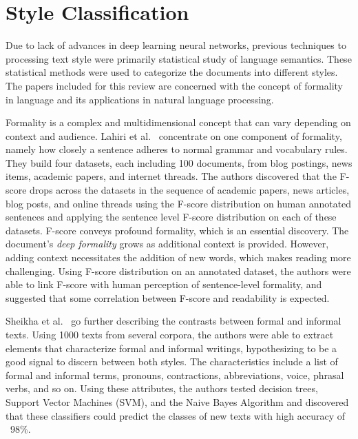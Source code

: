 \documentclass[akbc,twoside,11pt]{article}
\begin{document}
\section{Style Classification}
\label{sec:style_class}

Due to lack of advances in deep learning neural networks, previous techniques to processing text style were primarily statistical study of language semantics. These statistical methods were used to categorize the documents into different styles. The papers included for this review are concerned with the concept of formality in language and its applications in natural language processing.

Formality is a complex and multidimensional concept that can vary depending on context and audience. Lahiri et al.~\cite{lahiri2011informality} concentrate on one component of formality, namely how closely a sentence adheres to normal grammar and vocabulary rules. They build four datasets, each including 100 documents, from blog postings, news items, academic papers, and internet threads. The authors discovered that the F-score drops across the datasets in the sequence of academic papers, news articles, blog posts, and online threads using the F-score distribution on human annotated sentences and applying the sentence level F-score distribution on each of these datasets. F-score conveys profound formality, which is an essential discovery. The document's \textit{deep formality} grows as additional context is provided. However, adding context necessitates the addition of new words, which makes reading more challenging. Using F-score distribution on an annotated dataset, the authors were able to link F-score with human perception of sentence-level formality, and suggested that some correlation between F-score and readability is expected. 

Sheikha et al.~\cite{sheikha2010automatic} go further describing the contrasts between formal and informal texts. Using 1000 texts from several corpora, the authors were able to extract elements that characterize formal and informal writings, hypothesizing to be a good signal to discern between both styles. The characteristics include a list of formal and informal terms, pronouns, contractions, abbreviations, voice, phrasal verbs, and so on. Using these attributes, the authors tested decision trees, Support Vector Machines (SVM), and the Naive Bayes Algorithm and discovered that these classifiers could predict the classes of new texts with high accuracy of ~98\%.
\end{document}
